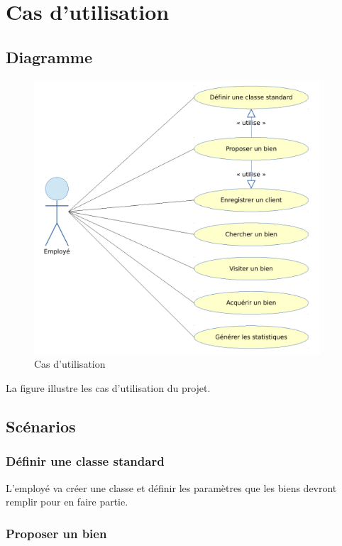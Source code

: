 \chapter{Cas d'utilisation}

\section{Diagramme}

\begin{figure}
  \centering
  \includegraphics[width=0.95\textwidth]{IMG/uc}
  \caption{Cas d'utilisation}
  \label{img_uc}
\end{figure}

La figure  illustre les cas d'utilisation du projet.

\section{Scénarios}

\subsection{Définir une classe standard}

L'employé va créer une classe et définir les paramètres que les biens devront remplir pour en faire partie.

\subsection{Proposer un bien}


